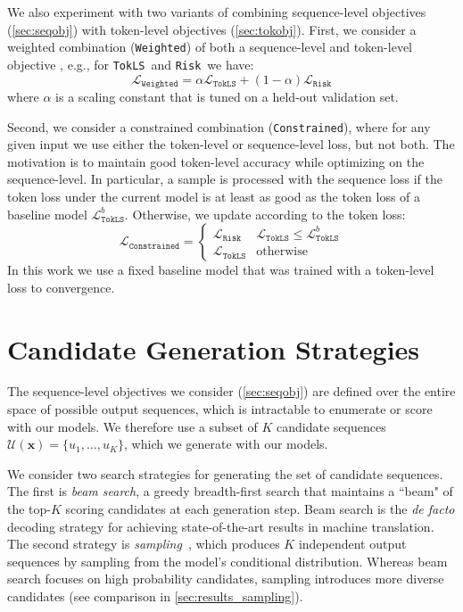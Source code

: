 \documentclass[11pt,a4paper]{article}
\newcommand{\source}{\mathbf{x}}
\newcommand{\candhypos}{\mathcal{U}}
\newcommand{\candhypotok}{u}
\newcommand{\TokLS}{\texttt{TokLS}}
\newcommand{\Risk}{\texttt{Risk}}
\newcommand{\Constrained}{\texttt{Constrained}}
\newcommand{\Weighted}{\texttt{Weighted}}
\begin{document}
We also experiment with two variants of combining sequence-level objectives (\textsection\ref{sec:seqobj}) with token-level objectives (\textsection\ref{sec:tokobj}).
First, we consider a weighted combination (\Weighted) of both a sequence-level and token-level objective \citep{wu2016google}, e.g., for \TokLS~and \Risk~we have:
\begin{equation}
\mathcal{L}_{\Weighted} = \alpha \mathcal{L}_{\TokLS} + (1 - \alpha) \mathcal{L}_{\Risk}
\label{eq:weighted}
\end{equation}
where $\alpha$ is a scaling constant that is tuned on a held-out validation set.

Second, we consider a constrained combination (\Constrained), where for any given input we use either the token-level or sequence-level loss, but not both.
The motivation is to maintain good token-level accuracy while optimizing on the sequence-level.
In particular, a sample is processed with the sequence loss if the token loss under the current model is at least as good as the token loss of a baseline model $\mathcal{L}^{b}_{\TokLS}$. Otherwise, we update according to the token loss:
\begin{equation}
\mathcal{L}_{\Constrained} =
\begin{cases}
\mathcal{L}_{\Risk} & \mathcal{L}_{\TokLS} \leq \mathcal{L}^{b}_{\TokLS}  \\
\mathcal{L}_{\TokLS} & \text{otherwise}
\end{cases}
\label{eq:constrained}
\end{equation}
In this work we use a fixed baseline model that was trained with a token-level loss to convergence.


\section{Candidate Generation Strategies}
\label{sec:candidategen}

The sequence-level objectives we consider (\textsection\ref{sec:seqobj}) are defined over the entire space of possible output sequences, which is intractable to enumerate or score with our models.
We therefore use a subset of $K$ candidate sequences $\candhypos(\source) = \{\candhypotok_1, \dots, \candhypotok_K\}$, which we generate with our models.

We consider two search strategies for generating the set of candidate sequences.
The first is \emph{beam search}, a greedy breadth-first search that maintains a ``beam" of the top-$K$ scoring candidates at each generation step.
Beam search is the \emph{de facto} decoding strategy for achieving state-of-the-art results in machine translation.
The second strategy is \emph{sampling}~\citep{chatterjee}, which produces $K$ independent output sequences by sampling from the model's conditional distribution.
Whereas beam search focuses on high probability candidates, sampling introduces more diverse candidates (see comparison in \textsection\ref{sec:results_sampling}).
\end{document}

